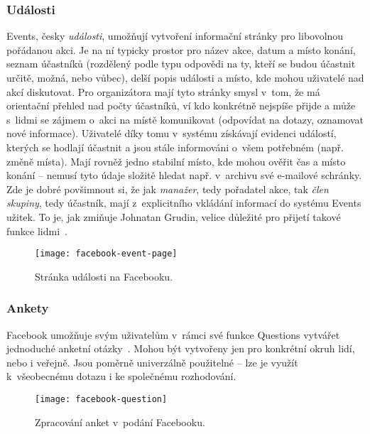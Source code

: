 \documentclass[12pt,oneside,final]{fithesis2}
\begin{document}
\subsubsection*{Události}
Events, česky \emph{události}, umožňují vytvoření informační stránky pro libovolnou pořádanou akci. Je na ní typicky prostor pro název akce, datum a místo konání, seznam účastníků (rozdělený podle typu odpovědi na ty, kteří se budou účastnit určitě, možná, nebo vůbec), delší popis události a místo, kde mohou uživatelé nad akcí diskutovat. Pro organizátora mají tyto stránky smysl v~tom, že má orientační přehled nad počty účastníků, ví kdo konkrétně nejspíše přijde a může s~lidmi se zájmem o~akci na místě komunikovat (odpovídat na dotazy, oznamovat nové informace). Uživatelé díky tomu v~systému získávají evidenci událostí, kterých se hodlají účastnit a jsou stále informováni o~všem potřebném (např. změně místa). Mají rovněž jedno stabilní místo, kde mohou ověřit čas a místo konání -- nemusí tyto údaje složitě hledat např. v~archivu své e-mailové schránky. Zde je dobré povšimnout si, že jak \emph{manažer}, tedy pořadatel akce, tak \emph{člen skupiny}, tedy účastník, mají z~explicitního vkládání informací do systému Events užitek. To je, jak zmiňuje Johnatan Grudin, velice důležité pro přijetí takové funkce lidmi~\cite{grudin1994groupware}.

\begin{figure}[h]
    \texttt{[image: facebook-event-page]}
    \caption{Stránka události na Facebooku.}
\end{figure}

\subsubsection*{Ankety}
Facebook umožňuje svým uživatelům v~rámci své funkce Questions vytvářet jednoduché anketní otázky~\cite{graham2011the}. Mohou být vytvořeny jen pro konkrétní okruh lidí, nebo i veřejně. Jsou poměrně univerzálně použitelné -- lze je využít k~všeobecnému dotazu i ke společnému rozhodování.

\begin{figure}[h]
    \texttt{[image: facebook-question]}
    \caption{Zpracování anket v~podání Facebooku.}
\end{figure}
\end{document}

